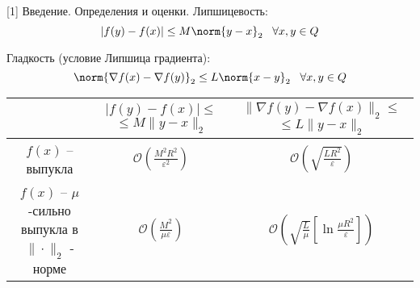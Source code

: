 
\begin{frame}{[1] Введение. Определения и оценки.}
    Липшицевость:
    $$
    |f(y) - f(x)| \leq M \norm{y-x}_2 \;\;\; \forall x, y \in Q
    $$

    Гладкость (условие Липшица градиента):
    $$
    \norm{\nabla f(x) - \nabla f(y)}_2 \leq L \norm{x - y}_2 \;\;\; \forall x, y \in Q
    $$
    
    \begin{table}[h]
        \centering
        \begin{tabular}{|c|c|c|}
            \hline
             & \makecell{$|f(y) - f(x)| \leq$ \\ $\leq M \| y - x \|_2$} & \makecell{$\|\nabla f(y) - \nabla f(x)\|_2 \leq $\\ $\leq L \| y - x \|_2$} \\
            \hline
            $f(x)$ -- выпукла & $\mathcal{O} \left( \frac{M^2 R^2}{\varepsilon^2} \right)$ & $\mathcal{O} \left( \sqrt{\frac{L R^2}{\varepsilon}} \right)$ \\
            \hline
            \makecell{$f(x)$ -- $\mu$-сильно \\ выпукла в $\| \cdot \|_2$ - норме} & $\mathcal{O} \left( \frac{M^2}{\mu \varepsilon} \right)$ & $\mathcal{O} \left( \sqrt{\frac{L}{\mu}} \left[\ln{\frac{\mu R^2}{\varepsilon}}\right] \right)$ \\
            \hline
        \end{tabular}
    \end{table}
\end{frame}

